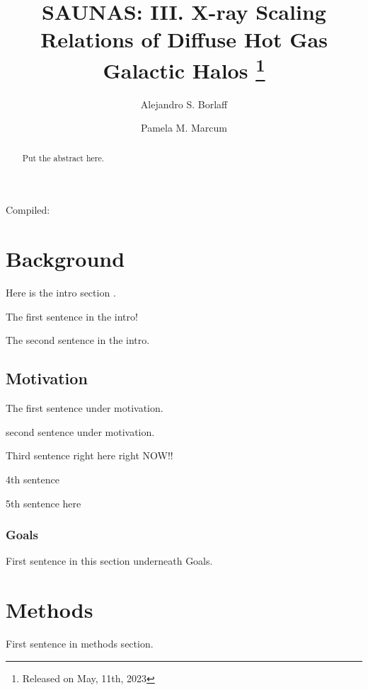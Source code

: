 \documentclass[modern]{aastex631}
\begin{document}
\hspace{2cm} Compiled: 

\title{\textbf{SAUNAS}: III. X-ray Scaling Relations of Diffuse Hot Gas Galactic Halos \footnote{Released on May, 11th, 2023}}
\author{Alejandro S. Borlaff}
\author{Pamela M. Marcum}

\begin{abstract}
Put the abstract here. 
\end{abstract}

\section{Background}
Here is the intro section \citep{aguerri+1998aj116_2136, bell+2006apj640_241,bell+2006apj652_270}. 

The first sentence in the intro! 

The second sentence in the intro. 

\subsection{Motivation}

The first sentence under motivation.

second sentence under motivation.

Third sentence right here right NOW!! 

4th sentence 

5th sentence here 

\subsubsection{Goals}
First sentence in this section underneath Goals. 

\section{Methods}
First sentence in methods section. 

\begin{acknowledgements}

\end{acknowledgements}
\vspace{5mm}


% 
 

\end{document}
